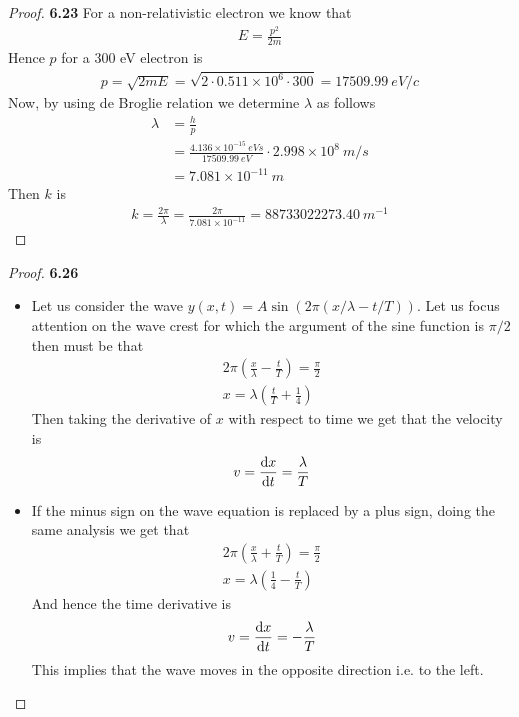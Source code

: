 \documentclass[11pt]{article}
\theoremstyle{definition}
\begin{document}
\begin{proof}{\textbf{6.23}}
    For a non-relativistic electron we know that
    \begin{align*}
        E = \frac{p^2}{2m}
    \end{align*}
    Hence $p$ for a 300 eV electron is
    \begin{align*}
        p = \sqrt{2mE} = \sqrt{2\cdot 0.511 \times 10^6 \cdot 300}
        = 17509.99~eV/c
    \end{align*}
    Now, by using de Broglie relation we determine $\lambda$ as follows
    \begin{align*}
        \lambda &= \frac{h}{p}\\
        &= \frac{4.136\times 10^{-15}~eVs}{17509.99~eV}
        \cdot 2.998\times 10^8~m/s\\
        &= 7.081\times 10^{-11}~m
    \end{align*}
    Then $k$ is
    \begin{align*}
        k = \frac{2\pi}{\lambda} = \frac{2\pi}{7.081\times 10^{-11}}
        = 88733022273.40~m^{-1}
    \end{align*}
\end{proof}
\begin{proof}{\textbf{6.26}}
\begin{itemize}
    \item [\textbf{(a)}] Let us consider the wave
    $y(x,t) = A\sin(2\pi(x/\lambda - t/T))$.
    Let us focus attention on the wave crest for which the argument of the
    sine function is $\pi/2$ then must be that
    \begin{align*}
        2\pi\left(\frac{x}{\lambda} - \frac{t}{T}\right) = \frac{\pi}{2}\\
        x = \lambda\left(\frac{t}{T} + \frac{1}{4}\right)
    \end{align*}
    Then taking the derivative of $x$ with respect to time we get that the
    velocity is
    \begin{align*}
        v = \dv{x}{t} = \frac{\lambda}{T}
    \end{align*}
    \item [\textbf{(b)}] If the minus sign on the wave equation is replaced
    by a plus sign, doing the same analysis we get that 
    \begin{align*}
        2\pi\left(\frac{x}{\lambda} + \frac{t}{T}\right) = \frac{\pi}{2}\\
        x = \lambda\left(\frac{1}{4} - \frac{t}{T}\right)
    \end{align*}
    And hence the time derivative is 
    \begin{align*}
        v = \dv{x}{t} = -\frac{\lambda}{T}
    \end{align*}
    This implies that the wave moves in the opposite direction i.e. to the
    left. 
\end{itemize}
\end{proof}
\end{document}
